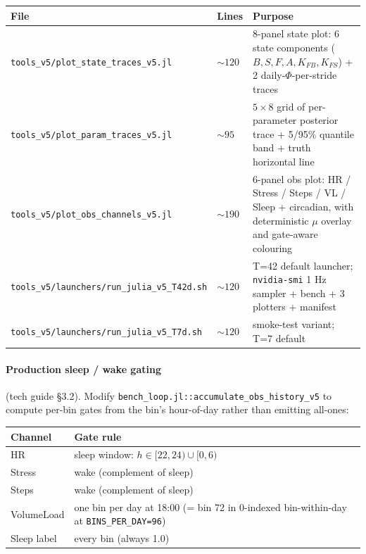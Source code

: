 \documentclass[11pt,a4paper]{article}
\begin{document}
\begin{center}\footnotesize
\begin{tabular}{lll}
\toprule
File & Lines & Purpose \\
\midrule
\texttt{tools\_v5/plot\_state\_traces\_v5.jl}      & $\sim 120$ & 8-panel state plot: 6 state components ($B, S, F, A, K_{FB}, K_{FS}$) + 2 daily-$\Phi$-per-stride traces \\
\texttt{tools\_v5/plot\_param\_traces\_v5.jl}      & $\sim 95$  & $5 \times 8$ grid of per-parameter posterior trace + 5/95\% quantile band + truth horizontal line \\
\texttt{tools\_v5/plot\_obs\_channels\_v5.jl}      & $\sim 190$ & 6-panel obs plot: HR / Stress / Steps / VL / Sleep + circadian, with deterministic $\mu$ overlay and gate-aware colouring \\
\texttt{tools\_v5/launchers/run\_julia\_v5\_T42d.sh} & $\sim 120$ & T=42 default launcher; \texttt{nvidia-smi} 1 Hz sampler + bench + 3 plotters + manifest \\
\texttt{tools\_v5/launchers/run\_julia\_v5\_T7d.sh}  & $\sim 120$ & smoke-test variant; T=7 default \\
\bottomrule
\end{tabular}
\end{center}

\paragraph{Production sleep / wake gating} (tech guide \S3.2).
Modify \texttt{bench\_loop.jl::accumulate\_obs\_history\_v5} to
compute per-bin gates from the bin's hour-of-day rather than
emitting all-ones:

\begin{center}\footnotesize
\begin{tabular}{ll}
\toprule
Channel  & Gate rule \\
\midrule
HR        & sleep window: $h \in [22, 24) \cup [0, 6)$ \\
Stress    & wake (complement of sleep) \\
Steps     & wake (complement of sleep) \\
VolumeLoad & one bin per day at 18:00 (= bin 72 in 0-indexed bin-within-day at \texttt{BINS\_PER\_DAY=96}) \\
Sleep label & every bin (always 1.0) \\
\bottomrule
\end{tabular}
\end{center}
\end{document}
